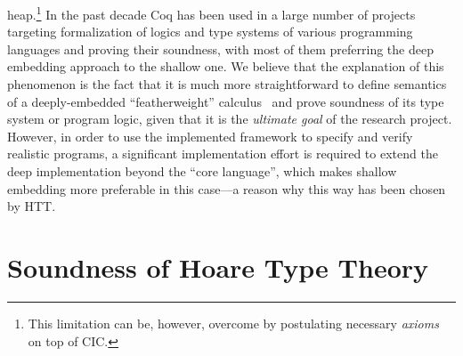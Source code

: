 heap.\footnote{This limitation can be, however, overcome by
postulating necessary \emph{axioms} on top of CIC.}
In the past decade Coq has been used in a large number of projects
targeting formalization of logics and type systems of various
programming languages and proving their soundness, with most of them
preferring the deep embedding approach to the shallow one. We believe
that the explanation of this phenomenon is the fact that it is much
more straightforward to define semantics of a deeply-embedded
``featherweight'' calculus~\cite{Igarashi-al:TOPLAS01} and prove
soundness of its type system or program logic, given that it is the
\textit{ultimate goal} of the research project. However, in order to use the
implemented framework to specify and verify realistic programs, a
significant implementation effort is required to extend the deep
implementation beyond the ``core language'', which makes shallow
embedding more preferable in this case---a reason why this way has
been chosen by HTT.
\section{Soundness of Hoare Type Theory}


